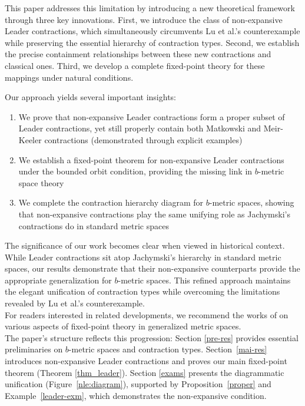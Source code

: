 \documentclass{birkjour}
\theoremstyle{definition}
\theoremstyle{remark}
\numberwithin{equation}{section}
\begin{document}
This paper addresses this limitation by introducing a new theoretical framework through three key innovations. First, we introduce the class of non-expansive Leader contractions, which simultaneously circumvents Lu et al.'s counterexample while preserving the essential hierarchy of contraction types. Second, we establish the precise containment relationships between these new contractions and classical ones. Third, we develop a complete fixed-point theory for these mappings under natural conditions.

Our approach yields several important insights:

\begin{enumerate}
    \item We prove that non-expansive Leader contractions form a proper subset of Leader contractions, yet still properly contain both Matkowski and Meir-Keeler contractions (demonstrated through explicit examples)
    
    \item We establish a fixed-point theorem for non-expansive Leader contractions under the bounded orbit condition, providing the missing link in $b$-metric space theory
    
    \item We complete the contraction hierarchy diagram for $b$-metric spaces, showing that non-expansive contractions play the same unifying role as Jachymski's contractions \cite{jachymski2011equivalent} do in standard metric spaces
\end{enumerate}

The significance of our work becomes clear when viewed in historical context. While Leader contractions sit atop Jachymski's hierarchy in standard metric spaces, our results demonstrate that their non-expansive counterparts provide the appropriate generalization for $b$-metric spaces. This refined approach maintains the elegant unification of contraction types while overcoming the limitations revealed by Lu et al.'s counterexample.\\
For readers interested in related developments, we recommend the works of \cite{castillo2023some, romaguera2012fixed, kadelburg2016boyd, ding2015some, ding2016some, miculescu2015caristi, mitrovic2019weak, bera2022boyd, nziku2019boyd, singh2022geraghty, kumar2022some} on various aspects of fixed-point theory in generalized metric spaces.\\

The paper's structure reflects this progression: Section \ref{pre-res} provides essential preliminaries on $b$-metric spaces and contraction types. Section~\ref{mai-res} introduces non-expansive Leader contractions and proves our main fixed-point theorem (Theorem \ref{thm_leader}). Section \ref{exams} presents the diagrammatic unification (Figure~\ref{nle:diagram}), supported by Proposition~\ref{proper} and Example~\ref{leader-exm}, which demonstrates the non-expansive condition.
\end{document}
